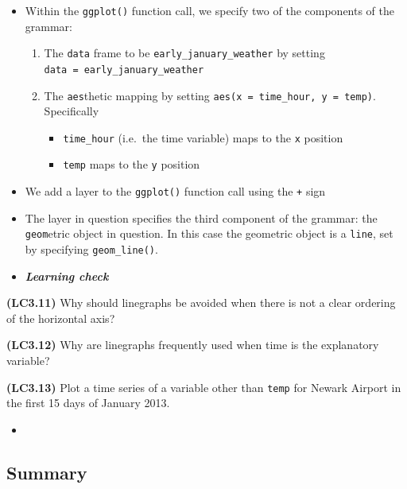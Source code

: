 \documentclass[12pt,]{krantz}
\providecommand{\tightlist}{%
  \setlength{\itemsep}{0pt}\setlength{\parskip}{0pt}}
\newenvironment{rmdblock}[1]
  {\begin{shaded*}
  \begin{itemize}
  \renewcommand{\labelitemi}{
    \raisebox{-.7\height}[0pt][0pt]{
    }
  }
  \item
  }
  {
  \end{itemize}
  \end{shaded*}
  }
\newenvironment{learncheck}
  {\begin{rmdblock}{warning}}
  {\end{rmdblock}}
\theoremstyle{definition}
\theoremstyle{definition}
\theoremstyle{definition}
\theoremstyle{remark}
\begin{document}
\begin{itemize}
\tightlist
\item
  Within the \texttt{ggplot()} function call, we specify two of the
  components of the grammar:

  \begin{enumerate}
  \def\labelenumi{\arabic{enumi}.}
  \tightlist
  \item
    The \texttt{data} frame to be \texttt{early\_january\_weather} by
    setting \texttt{data\ =\ early\_january\_weather}
  \item
    The \texttt{aes}thetic mapping by setting
    \texttt{aes(x\ =\ time\_hour,\ y\ =\ temp)}. Specifically

    \begin{itemize}
    \tightlist
    \item
      \texttt{time\_hour} (i.e.~the time variable) maps to the
      \texttt{x} position
    \item
      \texttt{temp} maps to the \texttt{y} position
    \end{itemize}
  \end{enumerate}
\item
  We add a layer to the \texttt{ggplot()} function call using the
  \texttt{+} sign
\item
  The layer in question specifies the third component of the grammar:
  the \texttt{geom}etric object in question. In this case the geometric
  object is a \texttt{line}, set by specifying \texttt{geom\_line()}.
\end{itemize}

\begin{learncheck}
\textbf{\emph{Learning check}}
\end{learncheck}

\textbf{(LC3.11)} Why should linegraphs be avoided when there is not a
clear ordering of the horizontal axis?

\textbf{(LC3.12)} Why are linegraphs frequently used when time is the
explanatory variable?

\textbf{(LC3.13)} Plot a time series of a variable other than
\texttt{temp} for Newark Airport in the first 15 days of January 2013.

\begin{learncheck}

\end{learncheck}

\subsection{Summary}\label{summary-1}
\end{document}
